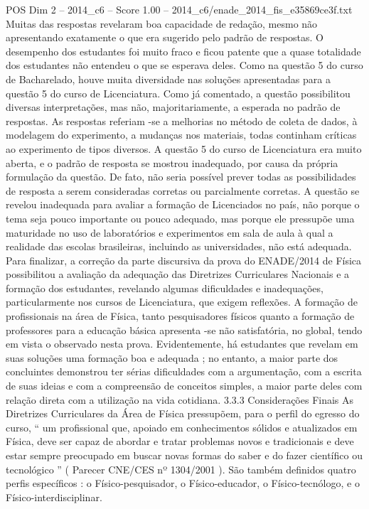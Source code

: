 \begin{textsample}{POS Dim 2 – 2014\_c6 – Score 1.00 – 2014\_c6/enade\_2014\_fis\_e35869ce3f.txt}
Muitas das respostas revelaram boa capacidade de redação, mesmo não apresentando exatamente o que era sugerido pelo padrão de respostas.
O desempenho dos estudantes foi muito fraco e ficou patente que a quase totalidade dos estudantes não entendeu o que se esperava deles.
Como na questão 5 do curso de Bacharelado, houve muita diversidade nas soluções apresentadas para a questão 5 do curso de Licenciatura.
Como já comentado, a questão possibilitou diversas interpretações, mas não, majoritariamente, a esperada no padrão de respostas.
As respostas referiam -se a melhorias no método de coleta de dados, à modelagem do experimento, a mudanças nos materiais, todas continham críticas ao experimento de tipos diversos.
A questão 5 do curso de Licenciatura era muito aberta, e o padrão de resposta se mostrou inadequado, por causa da própria formulação da questão.
De fato, não seria possível prever todas as possibilidades de resposta a serem consideradas corretas ou parcialmente corretas.
A questão se revelou inadequada para avaliar a formação de Licenciados no país, não porque o tema seja pouco importante ou pouco adequado, mas porque ele pressupõe uma maturidade no uso de laboratórios e experimentos em sala de aula à qual a realidade das escolas brasileiras, incluindo as universidades, não está adequada.
Para finalizar, a correção da parte discursiva da prova do ENADE/2014 de Física possibilitou a avaliação da adequação das Diretrizes Curriculares Nacionais e a formação dos estudantes, revelando algumas dificuldades e inadequações, particularmente nos cursos de Licenciatura, que exigem reflexões.
A formação de profissionais na área de Física, tanto pesquisadores físicos quanto a formação de professores para a educação básica apresenta -se não satisfatória, no global, tendo em vista o observado nesta prova.
Evidentemente, há estudantes que revelam em suas soluções uma formação boa e adequada ; no entanto, a maior parte dos concluintes demonstrou ter sérias dificuldades com a argumentação, com a escrita de suas ideias e com a compreensão de conceitos simples, a maior parte deles com relação direta com a utilização na vida cotidiana. 3.3.3 Considerações Finais As Diretrizes Curriculares da Área de Física pressupõem, para o perfil do egresso do curso, “ um profissional que, apoiado em conhecimentos sólidos e atualizados em Física, deve ser capaz de abordar e tratar problemas novos e tradicionais e deve estar sempre preocupado em buscar novas formas do saber e do fazer científico ou tecnológico ” ( Parecer CNE/CES nº 1304/2001 ).
São também definidos quatro perfis específicos : o Físico-pesquisador, o Físico-educador, o Físico-tecnólogo, e o Físico-interdisciplinar.

\end{textsample}
